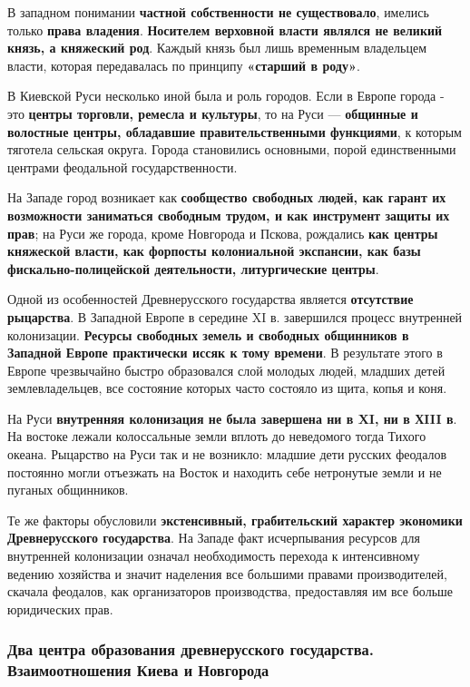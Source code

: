 \documentclass{article}
\begin{document}
 \hfill

 В западном понимании \textbf{частной собственности не существовало}, имелись только \textbf{права владения}. \textbf{Носителем верховной власти являлся не великий князь, а княжеский род}. Каждый князь был лишь временным владельцем власти, которая передавалась по принципу \textbf{«старший в роду»}.

 \hfill

В Киевской Руси несколько иной была и роль городов. Если в Европе города - это \textbf{центры торговли, ремесла и культуры}, то на Руси — \textbf{общинные и волостные центры, обладавшие правительственными функциями}, к которым тяготела сельская округа. Города становились основными, порой единственными центрами феодальной государственности.

На Западе город возникает как \textbf{сообщество свободных людей, как гарант их возможности заниматься свободным трудом, и как инструмент защиты их прав}; на Руси же города, кроме Новгорода и Пскова, рождались \textbf{как центры княжеской власти, как форпосты колониальной экспансии, как базы фискально-полицейской деятельности, литургические центры}.

\hfill

Одной из особенностей Древнерусского государства является \textbf{отсутствие рыцарства}. В Западной Европе в середине XI в. завершился процесс внутренней колонизации. \textbf{Ресурсы свободных земель и свободных общинников в Западной Европе практически иссяк к тому времени}. В результате этого в Европе чрезвычайно быстро образовался слой молодых людей, младших детей землевладельцев, все состояние которых часто состояло из щита, копья и коня.

На Руси \textbf{внутренняя колонизация не была завершена ни в XI, ни в ХIII в}. На востоке лежали колоссальные земли вплоть до неведомого тогда Тихого океана. Рыцарство на Руси так и не возникло: младшие дети русских феодалов постоянно могли отъезжать на Восток и находить себе нетронутые земли и не пуганых общинников.

Те же факторы обусловили \textbf{экстенсивный, грабительский характер экономики Древнерусского государства}. На Западе факт исчерпывания ресурсов для внутренней колонизации означал необходимость перехода к интенсивному ведению хозяйства и значит наделения все большими правами производителей, скачала феодалов, как организаторов производства, предоставляя им все больше юридических прав.

\subsubsection{Два центра образования древнерусского государства. Взаимоотношения Киева и Новгорода}
\end{document}
